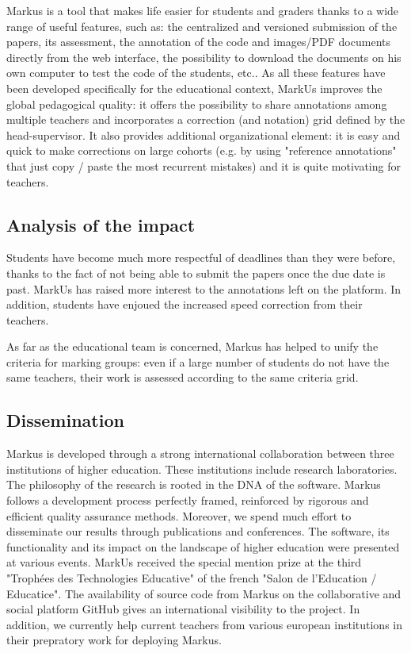\documentclass[twocolumn,10pt]{asme2e}
\begin{document}
Markus is a tool that makes life easier for students and graders thanks to a wide range of useful features, such as: the centralized and versioned submission of the papers, its assessment, the annotation of the code and images/PDF documents directly from the web interface, the possibility to download the documents on his own computer to test the code of the students, etc.. As all these  features have been developed specifically for the educational context, MarkUs improves the global pedagogical quality: it offers the possibility to share annotations among multiple teachers and incorporates a correction (and notation) grid defined by the head-supervisor. It also provides additional organizational element: it is easy and quick to make corrections on large cohorts (e.g. by using "reference annotations" that just copy / paste the most recurrent mistakes) and it is quite motivating for teachers. 

\subsection*{Analysis of the impact}

Students have become much more respectful of deadlines than they were before, thanks to the fact of not being able to submit the papers once the due date is past. MarkUs has raised more interest to the annotations left on the platform. In addition, students have enjoued the increased speed correction from their teachers. 

As far as the educational team is concerned, Markus has helped to unify the criteria for marking groups: even if a large number of students do not have the same teachers, their work is assessed according to the same criteria grid. 

\subsection*{Dissemination}

Markus is developed through a strong international collaboration between three institutions of higher education. These institutions include research laboratories. The philosophy of the research is rooted in the DNA of the software. Markus follows a development process perfectly framed, reinforced by rigorous and efficient quality assurance methods. Moreover, we spend much effort to disseminate our results through publications and conferences. The software, its functionality and its impact on the landscape of higher education were presented at various events. MarkUs received the special mention prize at the third "Troph\'{e}es des Technologies Educative" of the french "Salon de l'Education / Educatice". 
The availability of source code from Markus on the collaborative and social platform GitHub gives an international visibility to the project. In addition, we currently help current teachers from various european institutions in their prepratory work  for deploying Markus.
\end{document}

